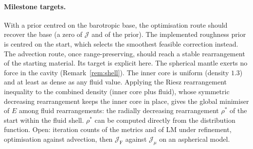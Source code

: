\documentclass[11pt]{article}
\newcommand{\Jf}{\mathscr{J}}  %
\newcommand{\JF}{\Jf _{\mathrm{F}}}
\newcommand{\Jmu}{\Jf _{\mu}}
\begin{document}
\paragraph{Milestone targets.} With a prior centred on the barotropic
base, the optimisation route should recover the base (a zero of $\Jf $ and
of the prior). The implemented roughness prior is centred on the start,
which selects the smoothest feasible correction instead. The advection
route, once range-preserving, should reach a stable rearrangement of the
starting material. Its target is explicit here. The spherical mantle
exerts no force in the cavity (Remark~\ref{rem:shell}). The inner core is
uniform (density $1.3$) and at least as dense as any fluid value. Applying
the Riesz rearrangement inequality to the combined density (inner core
plus fluid), whose symmetric decreasing rearrangement keeps the inner
core in place, gives the global minimiser of $E$ among fluid
rearrangements: the radially decreasing rearrangement $\rho^{*}$ of the
start within the fluid shell. $\rho^{*}$ can be computed directly from the
distribution function. Open: iteration counts of the metrics and of
LM under refinement, optimisation against advection, then $\JF$
against $\Jmu$ on an aspherical model.
\end{document}
